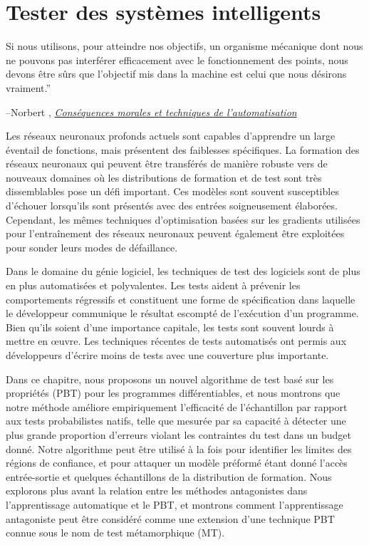 \chapter{Tester des systèmes intelligents}\label{ch:difftest}

\setlength{\epigraphwidth}{0.80\textwidth}
\epigraph{Si nous utilisons, pour atteindre nos objectifs, un organisme mécanique dont nous ne pouvons pas interférer efficacement avec le fonctionnement des points, nous devons être sûrs que l'objectif mis dans la machine est celui que nous désirons vraiment.''}{\begin{flushright}--Norbert \citet{wiener1960some}, \href{https://www.ias.ac.in/article/fulltext/reso/004/01/0080-0088}{\textit{Conséquences morales et techniques de l'automatisation}}~\end{flushright}}

Les réseaux neuronaux profonds actuels sont capables d'apprendre un large éventail de fonctions, mais présentent des faiblesses spécifiques. La formation des réseaux neuronaux qui peuvent être transférés de manière robuste vers de nouveaux domaines où les distributions de formation et de test sont très dissemblables pose un défi important. Ces modèles sont souvent susceptibles d'échouer lorsqu'ils sont présentés avec des entrées soigneusement élaborées. Cependant, les mêmes techniques d'optimisation basées sur les gradients utilisées pour l'entraînement des réseaux neuronaux peuvent également être exploitées pour sonder leurs modes de défaillance.

Dans le domaine du génie logiciel, les techniques de test des logiciels sont de plus en plus automatisées et polyvalentes. Les tests aident à prévenir les comportements régressifs et constituent une forme de spécification dans laquelle le développeur communique le résultat escompté de l'exécution d'un programme. Bien qu'ils soient d'une importance capitale, les tests sont souvent lourds à mettre en œuvre. Les techniques récentes de tests automatisés ont permis aux développeurs d'écrire moins de tests avec une couverture plus importante.

Dans ce chapitre, nous proposons un nouvel algorithme de test basé sur les propriétés (PBT) pour les programmes différentiables, et nous montrons que notre méthode améliore empiriquement l'efficacité de l'échantillon par rapport aux tests probabilistes natifs, telle que mesurée par sa capacité à détecter une plus grande proportion d'erreurs violant les contraintes du test dans un budget donné. Notre algorithme peut être utilisé à la fois pour identifier les limites des régions de confiance, et pour attaquer un modèle préformé étant donné l'accès entrée-sortie et quelques échantillons de la distribution de formation. Nous explorons plus avant la relation entre les méthodes antagonistes dans l'apprentissage automatique et le PBT, et montrons comment l'apprentissage antagoniste peut être considéré comme une extension d'une technique PBT connue sous le nom de test métamorphique (MT).


